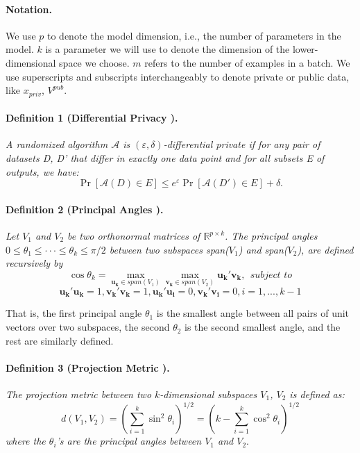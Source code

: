 \documentclass[11pt]{article}
\renewcommand{\epsilon}{\varepsilon}
\begin{document}
\paragraph{Notation.}
We use $p$ to denote the model dimension, i.e., the number of parameters in the model. $k$ is a parameter we will use to denote the dimension of the lower-dimensional space we choose. $m$ refers to the number of examples in a batch. We use superscripts and subscripts interchangeably to denote private or public data, like $x_{priv}$, $V^{pub}$.

\paragraph{Definition 1 (Differential Privacy \cite{dwork-dp}).} 
\textit{A randomized algorithm $\mathcal{A}$ is \emph{$(\epsilon, \delta)$-differential private} if for any pair of datasets D, D' that differ in exactly one data point and for all subsets E of outputs, we have:}
$$
\Pr[\mathcal{A}(D) \in E] \le e^{\epsilon}\Pr[\mathcal{A}(D') \in E] + \delta.
$$

\paragraph{Definition 2 (Principal Angles \cite{principleangles}).}
\textit{Let $V_1$ and $V_2$ be two orthonormal matrices of $\mathbb{R}^{p \times k}$. The \emph{principal angles} $0 \le \theta_1 \le \cdot\cdot\cdot \le \theta_k \le \pi / 2$ between two subspaces span($V_1$) and span($V_2$), are defined recursively by}
$$
    \cos\theta_k = \max\limits_{\mathbf{u_k} \in span(V_1)} \max\limits_{\mathbf{v_k} \in span(V_2)} \mathbf{u_k'v_k}, \ \ \textit{subject to} 
$$
\begin{equation*}
   \mathbf{u_k'u_k} = 1,  \mathbf{v_k'v_k} = 1,
   \mathbf{u_k'u_i} = 0, \mathbf{v_k'v_i} = 0, i=1, ...,k-1
\end{equation*}
   

That is, the first principal angle $\theta_1$ is the smallest angle between all pairs of unit vectors over two subspaces, the second $\theta_2$ is the second smallest angle, and the rest are similarly defined.


\paragraph{Definition 3 (Projection Metric \cite{projectionmetric, projectionmetric2}).}
\label{projmetricdef}
\textit{The \emph{projection metric} between two $k$-dimensional subspaces $V_1$, $V_2$ is defined as:}
$$
d\left(V_1, V_2\right)=\left(\sum_{i=1}^k \sin ^2 \theta_i\right)^{1 / 2}=\left(k-\sum_{i=1}^k \cos ^2 \theta_i\right)^{1 / 2}
$$
\textit{where the $\theta_i$'s are the principal angles between $V_1$ and $V_2$}.
\end{document}
